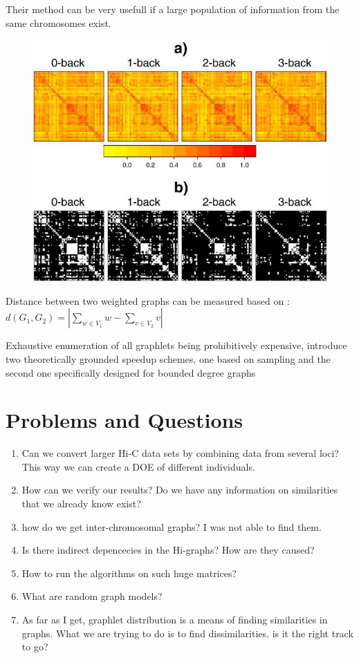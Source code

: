 \documentclass{article}
\begin{document}
Their method can be very usefull if a large population of information from the same
chromosomes exist.
\begin{figure}
    \centering
    \includegraphics[width=.5\textwidth]{figures/thresholded_adjacency.png}
    \caption{}
    \label{fig:thresholded_adjacency}
\end{figure}

Distance between two weighted graphs can be measured based on \cite{daneshpajouh2009metric}:\\
$d(G_1, G_2) = |\displaystyle\sum_{w\in V_1} w -
\displaystyle\sum_{v \in V_2} v|$

Exhaustive enumeration of all graphlets being
prohibitively expensive, \cite{shervashidze2009efficient} introduce two
theoretically grounded speedup schemes, one
based on sampling and the second one specifically
designed for bounded degree graphs

\section{Problems and Questions}
\begin{enumerate}
    \item Can we convert larger Hi-C data sets by combining data from 
        several loci? This way we can create a DOE of different 
        individuals.
    \item How can we verify our results? Do we have any information on 
        similarities that we already know exist?
    \item how do we get inter-chromosomal graphs?
        I was not able to find them.
    \item Is there indirect depencecies in the Hi-graphs? How are they caused?
    \item How to run the algorithms on such huge matrices?
    \item What are random graph models?
    \item As far as I get, graphlet distribution is a means of finding similarities
        in graphs. What we are trying to do is to find dissimilarities. is it 
        the right track to go?
\end{enumerate}
\end{document}
